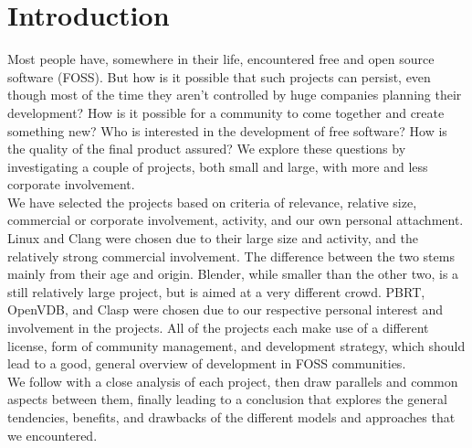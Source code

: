 \section{Introduction}
Most people have, somewhere in their life, encountered free and open source software (FOSS). But how is it possible that such projects can persist, even though most of the time they aren't controlled by huge companies planning their development? How is it possible for a community to come together and create something new? Who is interested in the development of free software? How is the quality of the final product assured? We explore these questions by investigating a couple of projects, both small and large, with more and less corporate involvement. \\

We have selected the projects based on criteria of relevance, relative size, commercial or corporate involvement, activity, and our own personal attachment. Linux and Clang were chosen due to their large size and activity, and the relatively strong commercial involvement. The difference between the two stems mainly from their age and origin. Blender, while smaller than the other two, is a still relatively large project, but is aimed at a very different crowd. PBRT, OpenVDB, and Clasp were chosen due to our respective personal interest and involvement in the projects. All of the projects each make use of a different license, form of community management, and development strategy, which should lead to a good, general overview of development in FOSS communities. \\

We follow with a close analysis of each project, then draw parallels and common aspects between them, finally leading to a conclusion that explores the general tendencies, benefits, and drawbacks of the different models and approaches that we encountered.

